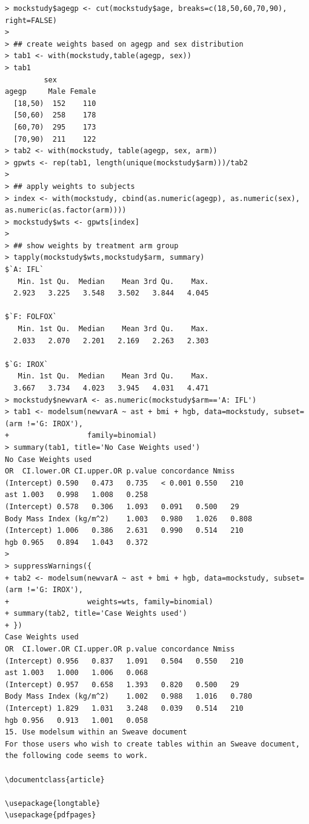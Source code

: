 \documentclass[
]{book}
\begin{document}
\begin{verbatim}
> mockstudy$agegp <- cut(mockstudy$age, breaks=c(18,50,60,70,90), right=FALSE)
> 
> ## create weights based on agegp and sex distribution
> tab1 <- with(mockstudy,table(agegp, sex))
> tab1
         sex
agegp     Male Female
  [18,50)  152    110
  [50,60)  258    178
  [60,70)  295    173
  [70,90)  211    122
> tab2 <- with(mockstudy, table(agegp, sex, arm))
> gpwts <- rep(tab1, length(unique(mockstudy$arm)))/tab2
> 
> ## apply weights to subjects
> index <- with(mockstudy, cbind(as.numeric(agegp), as.numeric(sex), as.numeric(as.factor(arm)))) 
> mockstudy$wts <- gpwts[index]
> 
> ## show weights by treatment arm group
> tapply(mockstudy$wts,mockstudy$arm, summary)
$`A: IFL`
   Min. 1st Qu.  Median    Mean 3rd Qu.    Max. 
  2.923   3.225   3.548   3.502   3.844   4.045 

$`F: FOLFOX`
   Min. 1st Qu.  Median    Mean 3rd Qu.    Max. 
  2.033   2.070   2.201   2.169   2.263   2.303 

$`G: IROX`
   Min. 1st Qu.  Median    Mean 3rd Qu.    Max. 
  3.667   3.734   4.023   3.945   4.031   4.471 
> mockstudy$newvarA <- as.numeric(mockstudy$arm=='A: IFL')
> tab1 <- modelsum(newvarA ~ ast + bmi + hgb, data=mockstudy, subset=(arm !='G: IROX'), 
+                  family=binomial)
> summary(tab1, title='No Case Weights used')
No Case Weights used
OR  CI.lower.OR CI.upper.OR p.value concordance Nmiss
(Intercept) 0.590   0.473   0.735   < 0.001 0.550   210
ast 1.003   0.998   1.008   0.258       
(Intercept) 0.578   0.306   1.093   0.091   0.500   29
Body Mass Index (kg/m^2)    1.003   0.980   1.026   0.808       
(Intercept) 1.006   0.386   2.631   0.990   0.514   210
hgb 0.965   0.894   1.043   0.372       
> 
> suppressWarnings({
+ tab2 <- modelsum(newvarA ~ ast + bmi + hgb, data=mockstudy, subset=(arm !='G: IROX'), 
+                  weights=wts, family=binomial)
+ summary(tab2, title='Case Weights used')
+ })
Case Weights used
OR  CI.lower.OR CI.upper.OR p.value concordance Nmiss
(Intercept) 0.956   0.837   1.091   0.504   0.550   210
ast 1.003   1.000   1.006   0.068       
(Intercept) 0.957   0.658   1.393   0.820   0.500   29
Body Mass Index (kg/m^2)    1.002   0.988   1.016   0.780       
(Intercept) 1.829   1.031   3.248   0.039   0.514   210
hgb 0.956   0.913   1.001   0.058       
15. Use modelsum within an Sweave document
For those users who wish to create tables within an Sweave document, the following code seems to work.

\documentclass{article}

\usepackage{longtable}
\usepackage{pdfpages}


\end{verbatim}
\end{document}
